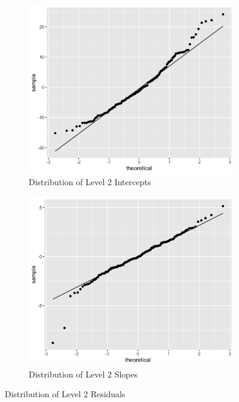 \documentclass[12pt,twoside,letterpaper]{article}
\theoremstyle{definition}
\theoremstyle{definition}
\begin{document}
\begin{figure}[H] 
    \centering
    \begin{subfigure}[b]{0.39\textwidth}
    \centering
    \includegraphics[width=\textwidth]{pics/lv2 resid int.png}
    \caption[]%
    {{\small Distribution of Level 2 Intercepts}}
    \label{fig: lv2 int qq}
    \end{subfigure}
    \hfill
    \begin{subfigure}[b]{0.39\textwidth}
    \centering
    \includegraphics[width=\textwidth]{pics/lv2 resid stand.png}
    \caption[]%
    {{\small Distribution of Level 2 Slopes}}
    \label{fig: lv2 stand qq}
    \end{subfigure}
    \caption[]
    {\small Distribution of Level 2 Residuals}
    \label{fig: lv2 qq}
    \end{figure}
\end{document}
